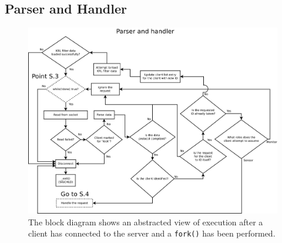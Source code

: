 \documentclass[12pt,english,a4paper]{report}
\begin{document}
\subsection{Parser and Handler}\label{parser_and_handler}
\begin{figure}
\centering
  \includegraphics[scale=0.3]{server_flow.pdf}
   \caption[Socket Server execution flow block diagram]{The block diagram shows an abstracted view of execution after a client has connected to the server and a \texttt{fork()} has been performed.}
   \label{server_flow}
\end{figure}
\end{document}
